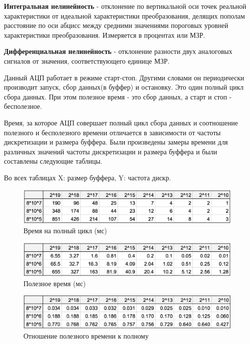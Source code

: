 \textbf{Интегральная нелинейность} - отклонение по вертикальной оси точек реальной характеристики от идеальной характеристики преобразования, делящих пополам расстояние по оси абцисс между средними значениями пороговых уровней характеристики преобразования. Измеряется в процентах или  МЗР.

\textbf{Дифференциальная нелинейность} - отклонение разности двух аналоговых сигналов от значения, соответствующего единице МЗР.

Данный АЦП работает в режиме старт-стоп. Другими словами он периодически производит запуск, сбор данных(в буффер) и остановку. Это один полный цикл сбора данных. При этом полезное время - это сбор данных, а старт и стоп - бесполезное.

Время, за которое АЦП совершает полный цикл сбора данных и соотношение полезного и бесполезного времени отличается в зависимости от частоты дискретизации и размера буффера. Были произведены замеры времени для различных значений частоты дискретизации и размера буффера и были составлены следующие таблицы.

Во всех таблицах X: размер буффера, Y: частота дискр.

\begin{figure}[H]
\centering
\includegraphics[width=\textwidth]{cycle-time.png}
\caption{Время на полный цикл (мс)}
\end{figure}

\begin{figure}[H]
\centering
\includegraphics[width=\textwidth]{good-time.png}
\caption{Полезное время (мс)}
\end{figure}

\begin{figure}[H]
\centering
\includegraphics[width=\textwidth]{bad-div-by-good.png}
\caption{Отношение полезного времени к полному}
\end{figure}

